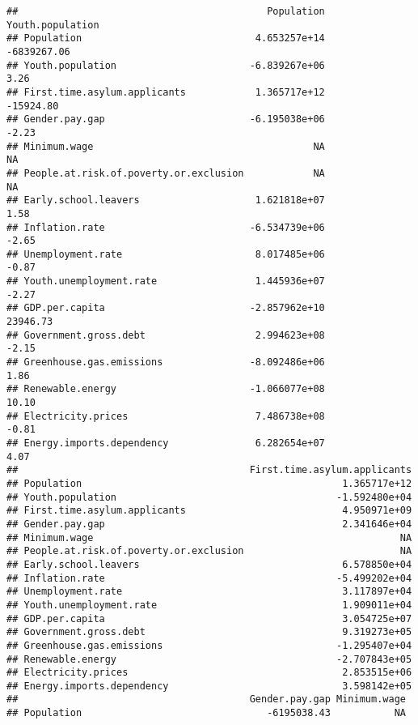 \documentclass[
]{article}
\begin{document}
\begin{verbatim}
##                                           Population Youth.population
## Population                              4.653257e+14      -6839267.06
## Youth.population                       -6.839267e+06             3.26
## First.time.asylum.applicants            1.365717e+12        -15924.80
## Gender.pay.gap                         -6.195038e+06            -2.23
## Minimum.wage                                      NA               NA
## People.at.risk.of.poverty.or.exclusion            NA               NA
## Early.school.leavers                    1.621818e+07             1.58
## Inflation.rate                         -6.534739e+06            -2.65
## Unemployment.rate                       8.017485e+06            -0.87
## Youth.unemployment.rate                 1.445936e+07            -2.27
## GDP.per.capita                         -2.857962e+10         23946.73
## Government.gross.debt                   2.994623e+08            -2.15
## Greenhouse.gas.emissions               -8.092486e+06             1.86
## Renewable.energy                       -1.066077e+08            10.10
## Electricity.prices                      7.486738e+08            -0.81
## Energy.imports.dependency               6.282654e+07             4.07
##                                        First.time.asylum.applicants
## Population                                             1.365717e+12
## Youth.population                                      -1.592480e+04
## First.time.asylum.applicants                           4.950971e+09
## Gender.pay.gap                                         2.341646e+04
## Minimum.wage                                                     NA
## People.at.risk.of.poverty.or.exclusion                           NA
## Early.school.leavers                                   6.578850e+04
## Inflation.rate                                        -5.499202e+04
## Unemployment.rate                                      3.117897e+04
## Youth.unemployment.rate                                1.909011e+04
## GDP.per.capita                                         3.054725e+07
## Government.gross.debt                                  9.319273e+05
## Greenhouse.gas.emissions                              -1.295407e+04
## Renewable.energy                                      -2.707843e+05
## Electricity.prices                                     2.853515e+06
## Energy.imports.dependency                              3.598142e+05
##                                        Gender.pay.gap Minimum.wage
## Population                                -6195038.43           NA

\end{verbatim}
\end{document}
